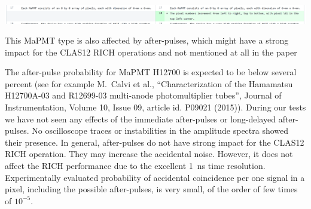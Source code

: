 \documentclass[11pt]{report}
\begin{document}
\includegraphics[width=\linewidth]{round1/2.03.png}


\begin{tcolorbox}[enlarge top by=2em,colbacktitle=black!60!white,colframe=black!80!white,left=0pt,right=0pt,top=0pt,bottom=0pt,boxrule=0.3pt,title=\bfseries2.04]
This MaPMT type is also affected by after-pulses, which might have a strong impact for the CLAS12 RICH operations and not mentioned at all in the paper
\end{tcolorbox}


The after-pulse probability for MaPMT H12700 is expected to be below several percent (see for example M.~Calvi et al.,   ``Characterization of the Hamamatsu H12700A-03 and R12699-03 multi-anode photomultiplier tubes'', Journal of Instrumentation, Volume 10, Issue 09, article id. P09021 (2015)). 
During our tests we have not seen any effects of the immediate after-pulses or long-delayed after-pulses. 
No oscilloscope traces or  instabilities in the amplitude spectra showed their presence.
In general, after-pulses do not have strong impact for the CLAS12 RICH operation. They may increase the accidental noise. However, it does not affect the RICH performance due to the excellent 1~ns time resolution. Experimentally evaluated probability of accidental coincidence per one signal in a pixel, including the possible after-pulses, is very small, of the order of few times of $10^{-5}$.



\end{document}
